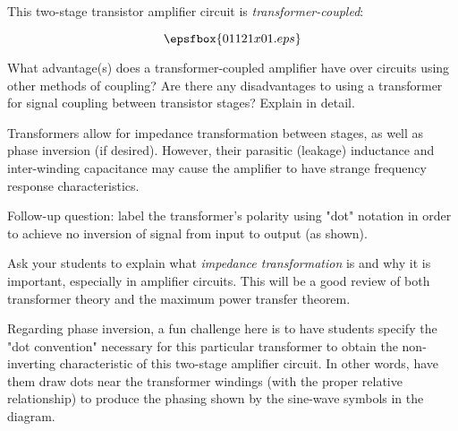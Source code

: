 

This two-stage transistor amplifier circuit is {\it transformer-coupled}:

$$\epsfbox{01121x01.eps}$$

What advantage(s) does a transformer-coupled amplifier have over circuits using other methods of coupling?  Are there any disadvantages to using a transformer for signal coupling between transistor stages?  Explain in detail.







Transformers allow for impedance transformation between stages, as well as phase inversion (if desired).  However, their parasitic (leakage) inductance and inter-winding capacitance may cause the amplifier to have strange frequency response characteristics.

\vskip 10pt

Follow-up question: label the transformer's polarity using "dot" notation in order to achieve no inversion of signal from input to output (as shown).







Ask your students to explain what {\it impedance transformation} is and why it is important, especially in amplifier circuits.  This will be a good review of both transformer theory and the maximum power transfer theorem.

Regarding phase inversion, a fun challenge here is to have students specify the "dot convention" necessary for this particular transformer to obtain the non-inverting characteristic of this two-stage amplifier circuit.  In other words, have them draw dots near the transformer windings (with the proper relative relationship) to produce the phasing shown by the sine-wave symbols in the diagram.




